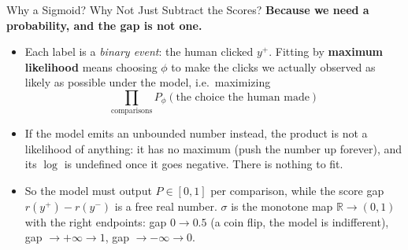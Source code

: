 \begin{frame}{Why a Sigmoid? Why Not Just Subtract the Scores?}
\textbf{Because we need a probability, and the gap is not one.}
\vspace{0.6em}
\begin{itemize}\itemsep0.45em\small
    \item Each label is a \emph{binary event}: the human clicked $y^+$. Fitting by
          \textbf{maximum likelihood} means choosing $\phi$ to make the clicks we
          actually observed as likely as possible under the model, i.e.\ maximizing
          \[
              \prod_{\text{comparisons}} P_\phi(\text{the choice the human made})
          \]
    \item {} If the model
          emits an unbounded number instead, the product is not a likelihood of
          anything: it has no maximum (push the number up forever), and its $\log$ is
          undefined once it goes negative. There is nothing to fit.
    \item So the model must output $P\in[0,1]$ per comparison, while the score gap
          $r(y^+)-r(y^-)$ is a free real number. $\sigma$ is the monotone map
          $\mathbb{R}\to(0,1)$ with the right endpoints: gap $0 \to 0.5$
          (a coin flip, the model is indifferent), gap $\to+\infty \to 1$,
          gap $\to-\infty \to 0$.
\end{itemize}
\end{frame}

